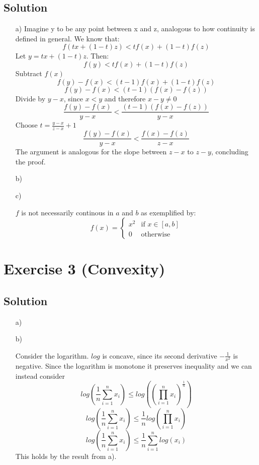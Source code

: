 \documentclass[10pt]{article}
\numberwithin{equation}{section}
\begin{document}
\subsection*{Solution}
\begin{enumerate}
\item[a)]{
    Imagine y to be any point between x and z, analogous to how continuity is defined in general.
    We know that:
    $$f(tx + (1-t)z) < tf(x) + (1-t)f(z)$$
    Let $y = tx + (1-t)z$. Then:
    $$ f(y) < tf(x) + (1-t)f(z)$$ 
    Subtract $f(x)$
    $$ f(y) - f(x) < (t-1)f(x) + (1-t)f(z)$$
    $$ f(y) - f(x) < (t-1)(f(x) - f(z))$$
    Divide by $y-x$, since $x < y$ and therefore $x-y \neq 0$
    $$ \frac{f(y) - f(x)}{y-x} < \frac{(t-1)(f(x) - f(z))}{y-x}$$
    Choose $t = \frac{y-x}{z-x} +1$
    $$ \frac{f(y) - f(x)}{y-x} < \frac{f(x) - f(z)}{z-x}$$
    The argument is analogous for the slope between $z-x$ to $z-y$, concluding the proof.
}
\item[b)]{

}
\item[c)]{
    $f$ is not necessarily continous in $a$ and $b$ as exemplified by:
    $$f(x) = 
    \begin{cases}
      x^2 & \text{if } x \in [a,b]\\
      0 & \text{otherwise}
    \end{cases}
    $$

  }

\end{enumerate}

\section*{Exercise 3 (Convexity)}
\subsection*{Solution}

\begin{enumerate}
\item[a)]{

}
\item[b)]{
    Consider the logarithm. $log$ is concave, since its second derivative $-\frac{1}{x^2}$ is negative.
    Since the logarithm is monotone it preserves inequality and we can instead consider
    $$log(\frac{1}{n} \sum_{i=1}^{n}x_i) \leq log((\prod_{i=1}^n x_i)^{\frac{1}{n}})$$
    $$log(\frac{1}{n} \sum_{i=1}^{n}x_i) \leq \frac{1}{n} log(\prod_{i=1}^n x_i)$$
    $$log(\frac{1}{n} \sum_{i=1}^{n}x_i) \leq \frac{1}{n} \sum_{i=1}^n log(x_i)$$
    This holds by the result from a).

}
\end{enumerate}
\end{document}
